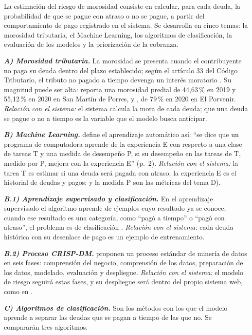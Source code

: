 \documentclass[12pt,a4paper]{report}
\begin{document}
La estimación del riesgo de morosidad consiste en calcular, para cada deuda, la probabilidad de que se pague con atraso o no se pague, a partir del comportamiento de pago registrado en el sistema. Se desarrolla en cinco temas: la morosidad tributaria, el Machine Learning, los algoritmos de clasificación, la evaluación de los modelos y la priorización de la cobranza.

\noindent\textbf{\textit{A) Morosidad tributaria.}} La morosidad se presenta cuando el contribuyente no paga su deuda dentro del plazo establecido; según el artículo 33 del Código Tributario, el tributo no pagado a tiempo devenga un interés moratorio \parencite{codigotributario}. Su magnitud puede ser alta: \textcite{paredes2022} reporta una morosidad predial de 44,63\,\% en 2019 y 55,12\,\% en 2020 en San Martín de Porres, y \textcite{riosvelasquez2022}, de 79\,\% en 2020 en El Porvenir. \textit{Relación con el sistema:} el sistema calcula la mora de cada deuda; que una deuda se pague o no a tiempo es la variable que el modelo busca anticipar.

\noindent\textbf{\textit{B) Machine Learning.}} \textcite{mitchell1997} define el aprendizaje automático así: ``se dice que un programa de computadora aprende de la experiencia E con respecto a una clase de tareas T y una medida de desempeño P, si su desempeño en las tareas de T, medido por P, mejora con la experiencia E'' (p.~2). \textit{Relación con el sistema:} la tarea T es estimar si una deuda será pagada con atraso; la experiencia E es el historial de deudas y pagos; y la medida P son las métricas del tema D).

\noindent\textbf{\textit{B.1) Aprendizaje supervisado y clasificación.}} En el aprendizaje supervisado el algoritmo aprende de ejemplos cuyo resultado ya se conoce; cuando ese resultado es una categoría, como ``pagó a tiempo'' o ``pagó con atraso'', el problema es de clasificación \parencite{mitchell1997}. \textit{Relación con el sistema:} cada deuda histórica con su desenlace de pago es un ejemplo de entrenamiento.

\noindent\textbf{\textit{B.2) Proceso CRISP-DM.}} \textcite{chapman2000} proponen un proceso estándar de minería de datos en seis fases: comprensión del negocio, comprensión de los datos, preparación de los datos, modelado, evaluación y despliegue. \textit{Relación con el sistema:} el modelo de riesgo seguirá estas fases, y su despliegue será dentro del propio sistema web, como en \textcite{encalada2025}.

\noindent\textbf{\textit{C) Algoritmos de clasificación.}} Son los métodos con los que el modelo aprende a separar las deudas que se pagan a tiempo de las que no. Se compararán tres algoritmos.
\end{document}

